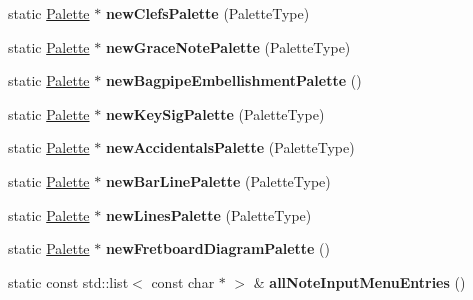 \begin{DoxyCompactItemize}
\item 
\mbox{\label{class_ms_1_1_muse_score_a0648e11c35fe3221b36d4f94e2e7f094}} 
static \hyperlink{class_ms_1_1_palette}{Palette} $\ast$ {\bfseries new\+Clefs\+Palette} (Palette\+Type)
\item 
\mbox{\label{class_ms_1_1_muse_score_a8133672881f30458429ad20336f42b22}} 
static \hyperlink{class_ms_1_1_palette}{Palette} $\ast$ {\bfseries new\+Grace\+Note\+Palette} (Palette\+Type)
\item 
\mbox{\label{class_ms_1_1_muse_score_a0581af5ec17bdc065767b9ca0a8bda4d}} 
static \hyperlink{class_ms_1_1_palette}{Palette} $\ast$ {\bfseries new\+Bagpipe\+Embellishment\+Palette} ()
\item 
\mbox{\label{class_ms_1_1_muse_score_aa33323023bcc22fd47ed8979da6bd13d}} 
static \hyperlink{class_ms_1_1_palette}{Palette} $\ast$ {\bfseries new\+Key\+Sig\+Palette} (Palette\+Type)
\item 
\mbox{\label{class_ms_1_1_muse_score_ae5052e66e56fa9071a65314ef4700d5f}} 
static \hyperlink{class_ms_1_1_palette}{Palette} $\ast$ {\bfseries new\+Accidentals\+Palette} (Palette\+Type)
\item 
\mbox{\label{class_ms_1_1_muse_score_ac04a69379903b27d791f02791ad7604d}} 
static \hyperlink{class_ms_1_1_palette}{Palette} $\ast$ {\bfseries new\+Bar\+Line\+Palette} (Palette\+Type)
\item 
\mbox{\label{class_ms_1_1_muse_score_a4a5930da2f3302c803989614167991df}} 
static \hyperlink{class_ms_1_1_palette}{Palette} $\ast$ {\bfseries new\+Lines\+Palette} (Palette\+Type)
\item 
\mbox{\label{class_ms_1_1_muse_score_a32aea3585e1d4587c495579f3de1d351}} 
static \hyperlink{class_ms_1_1_palette}{Palette} $\ast$ {\bfseries new\+Fretboard\+Diagram\+Palette} ()
\item 
\mbox{\label{class_ms_1_1_muse_score_a4b4740753710b5e1ed39d0c8834c6acf}} 
static const std\+::list$<$ const char $\ast$ $>$ \& {\bfseries all\+Note\+Input\+Menu\+Entries} ()

\end{DoxyCompactItemize}
